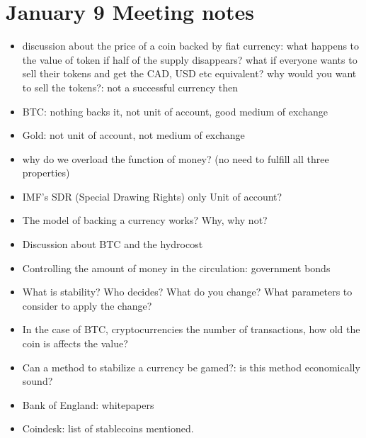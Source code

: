 \section{January 9 Meeting notes}
\begin{itemize}
	\item discussion about the price of a coin backed by fiat currency:
	what happens to the value of token if half of the supply disappears?
	what if everyone wants to sell their tokens and get the CAD, USD etc equivalent?
	why would you want to sell the tokens?: not a successful currency then
	\item BTC: nothing backs it, not unit of account, good medium of exchange
	\item Gold: not unit of account, not medium of exchange
	\item why do we overload the function of money? (no need to fulfill all three properties)
	\item IMF's SDR (Special Drawing Rights) only Unit of account?
	\item The model of backing a currency works? Why, why not?
	\item Discussion about BTC and the hydrocost
	\item Controlling the amount of money in the circulation: government bonds
	\item What is stability?
	Who decides?
	What do you change?
	What parameters to consider to apply the change?
	\item In the case of BTC, cryptocurrencies the number of transactions, how old the coin is affects the value?
	\item Can a method to stabilize a currency be gamed?: is this method economically sound?
	\item Bank of England: whitepapers
	\item Coindesk: list of stablecoins mentioned.
\end{itemize}

